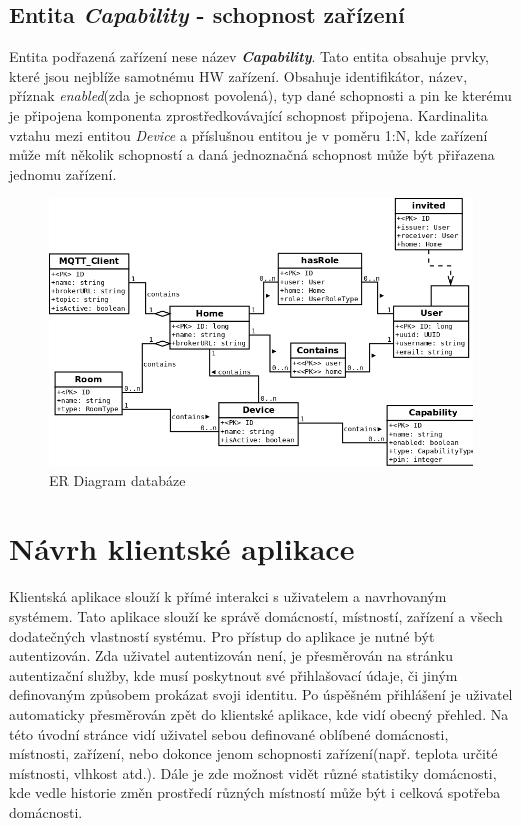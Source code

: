 \subsection*{Entita \emph{Capability} - schopnost zařízení}
\label{databaze:capability}
Entita podřazená zařízení nese název \textbf{\emph{Capability}}. Tato entita obsahuje prvky, které jsou nejblíže samotnému HW zařízení.
Obsahuje identifikátor, název, příznak \emph{enabled}(zda je schopnost povolená), typ dané schopnosti a pin ke kterému je připojena komponenta zprostředkovávající schopnost připojena.
Kardinalita vztahu mezi entitou \emph{Device} a příslušnou entitou je v poměru 1:N, kde zařízení může mít několik schopností a daná jednoznačná schopnost může být přiřazena jednomu zařízení.

\begin{figure}[hbt]
  \centering
  \includegraphics[width=0.9 \linewidth]{obrazky-figures/erdiagram.png}
  \caption{ER Diagram databáze}
  \label{figure:er_databaze}
\end{figure}

\newpage
\section{Návrh klientské aplikace}
\label{navrh:frontend}

Klientská aplikace slouží k přímé interakci s uživatelem a navrhovaným systémem.
Tato aplikace slouží ke správě domácností, místností, zařízení a všech dodatečných vlastností systému.
Pro přístup do aplikace je nutné být autentizován.
Zda uživatel autentizován není, je přesměrován na stránku autentizační služby, kde musí poskytnout své přihlašovací údaje, či jiným definovaným způsobem prokázat svoji identitu.
Po úspěšném přihlášení je uživatel automaticky přesměrován zpět do klientské aplikace, kde vidí obecný přehled.
Na této úvodní stránce vidí uživatel sebou definované oblíbené domácnosti, místnosti, zařízení, nebo dokonce jenom schopnosti zařízení(např. teplota určité místnosti, vlhkost atd.).
Dále je zde možnost vidět různé statistiky domácnosti, kde vedle historie změn prostředí různých místností může být i celková spotřeba domácnosti.

